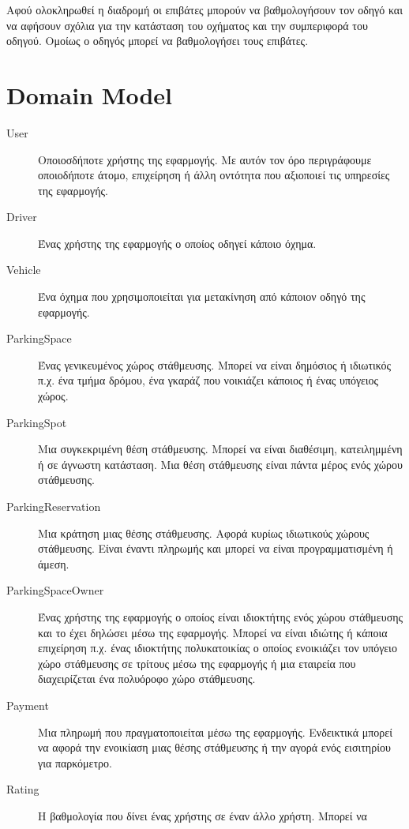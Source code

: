 \documentclass[11pt]{article}
\begin{document}
Αφού ολοκληρωθεί η διαδρομή οι επιβάτες μπορούν να βαθμολογήσουν τον
οδηγό και να αφήσουν σχόλια για την κατάσταση του οχήματος και την
συμπεριφορά του οδηγού. Ομοίως ο οδηγός μπορεί να βαθμολογήσει τους
επιβάτες.

\newpage

\section{Domain Model}

\begin{description}
    \item[User]
        Οποιοσδήποτε χρήστης της εφαρμογής. Με αυτόν τον όρο περιγράφουμε
        οποιοδήποτε άτομο, επιχείρηση ή άλλη οντότητα που αξιοποιεί τις
        υπηρεσίες της εφαρμογής.
    \item[Driver]
        Ένας χρήστης της εφαρμογής ο οποίος οδηγεί κάποιο όχημα.
    \item[Vehicle]
        Ένα όχημα που χρησιμοποιείται για μετακίνηση από κάποιον οδηγό της
        εφαρμογής.
    \item[ParkingSpace]
        Ένας γενικευμένος χώρος στάθμευσης. Μπορεί να είναι δημόσιος ή ιδιωτικός
        π.χ. ένα τμήμα δρόμου, ένα γκαράζ που νοικιάζει κάποιος ή ένας υπόγειος
        χώρος.
    \item[ParkingSpot]
        Μια συγκεκριμένη θέση στάθμευσης. Μπορεί να είναι διαθέσιμη,
        κατειλημμένη ή σε άγνωστη κατάσταση. Μια θέση στάθμευσης είναι πάντα
        μέρος ενός χώρου στάθμευσης.
    \item[ParkingReservation]
        Μια κράτηση μιας θέσης στάθμευσης. Αφορά κυρίως ιδιωτικούς χώρους
        στάθμευσης. Eίναι έναντι πληρωμής και μπορεί να είναι
        προγραμματισμένη ή άμεση.
    \item[ParkingSpaceOwner]
        Ένας χρήστης της εφαρμογής ο οποίος είναι ιδιοκτήτης ενός χώρου
        στάθμευσης και το έχει δηλώσει μέσω της εφαρμογής. Μπορεί να
        είναι ιδιώτης ή κάποια επιχείρηση π.χ. ένας
        ιδιοκτήτης πολυκατοικίας ο οποίος ενοικιάζει τον υπόγειο χώρο στάθμευσης
        σε τρίτους μέσω της εφαρμογής ή μια εταιρεία που διαχειρίζεται ένα
        πολυόροφο χώρο στάθμευσης.
    \item[Payment]
        Μια πληρωμή που πραγματοποιείται μέσω της εφαρμογής. Ενδεικτικά μπορεί
        να αφορά την ενοικίαση μιας θέσης στάθμευσης ή την αγορά ενός
        εισιτηρίου για παρκόμετρο.
    \item[Rating]
        Η βαθμολογία που δίνει ένας χρήστης σε έναν άλλο χρήστη. Μπορεί να

\end{description}
\end{document}
